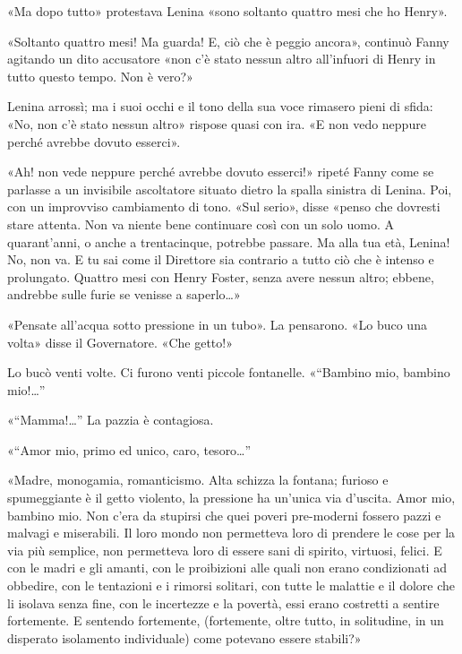 \documentclass[
a5paper, %
10pt, %
twoside, 
onecolumn, %
openany, %
]{memoir}
\renewenvironment{shaded}{%
  \def\FrameCommand{\fboxsep=\FrameSep \colorbox{shadecolor}}%
  \MakeFramed{\advance\hsize-\width \FrameRestore\FrameRestore}}%
 {\endMakeFramed}
\begin{document}
\begin{shaded}
    «Ma dopo tutto» protestava Lenina «sono soltanto quattro mesi che ho Henry».

«Soltanto quattro mesi! Ma guarda! E, ciò che è peggio ancora», continuò Fanny agitando un dito accusatore «non c’è stato nessun altro all’infuori di Henry in tutto questo tempo. Non è vero?»

Lenina arrossì; ma i suoi occhi e il tono della sua voce rimasero pieni di sfida: «No, non c’è stato nessun altro» rispose quasi con ira. «E non vedo neppure perché avrebbe dovuto esserci».

«Ah! non vede neppure perché avrebbe dovuto esserci!» ripeté Fanny come se parlasse a un invisibile ascoltatore situato dietro la spalla sinistra di Lenina. Poi, con un improvviso cambiamento di tono. «Sul serio», disse «penso che dovresti stare attenta. Non va niente bene continuare così con un solo uomo. A quarant’anni, o anche a trentacinque, potrebbe passare. Ma alla tua età, Lenina! No, non va. E tu sai come il Direttore sia contrario a tutto ciò che è intenso e prolungato. Quattro mesi con Henry Foster, senza avere nessun altro; ebbene, andrebbe sulle furie se venisse a saperlo…»
\end{shaded}

«Pensate all’acqua sotto pressione in un tubo». La pensarono. «Lo buco una volta» disse il Governatore. «Che getto!»

Lo bucò venti volte. Ci furono venti piccole fontanelle. «“Bambino mio, bambino mio!…”

«“Mamma!…” La pazzia è contagiosa.

«“Amor mio, primo ed unico, caro, tesoro…”

«Madre, monogamia, romanticismo. Alta schizza la fontana; furioso e spumeggiante è il getto violento, la pressione ha un’unica via d’uscita. Amor mio, bambino mio. Non c’era da stupirsi che quei poveri pre-moderni fossero pazzi e malvagi e miserabili. Il loro mondo non permetteva loro di prendere le cose per la via più semplice, non permetteva loro di essere sani di spirito, virtuosi, felici. E con le madri e gli amanti, con le proibizioni alle quali non erano condizionati ad obbedire, con le tentazioni e i rimorsi solitari, con tutte le malattie e il dolore che li isolava senza fine, con le incertezze e la povertà, essi erano costretti a sentire fortemente. E sentendo fortemente, (fortemente, oltre tutto, in solitudine, in un disperato isolamento individuale) come potevano essere stabili?»
\end{document}
